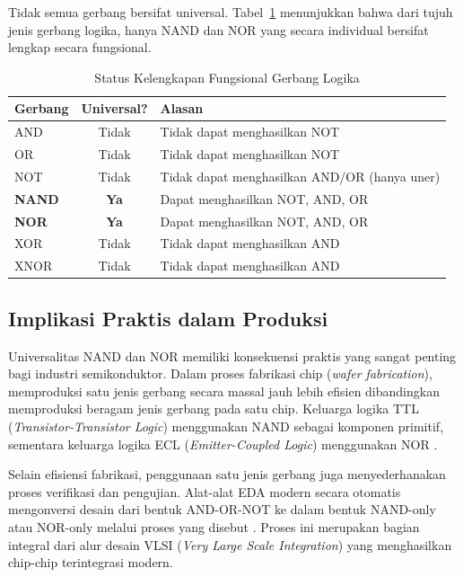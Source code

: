 Tidak semua gerbang bersifat universal. Tabel~\ref{tab:universalitas} menunjukkan bahwa dari tujuh jenis gerbang logika, hanya NAND dan NOR yang secara individual bersifat lengkap secara fungsional.

\begin{table}[htbp]
\centering
\renewcommand{\arraystretch}{1.3}
\begin{tabular}{|l|c|l|}
\hline
\textbf{Gerbang} & \textbf{Universal?} & \textbf{Alasan} \\ \hline
AND & Tidak & Tidak dapat menghasilkan NOT \\ \hline
OR & Tidak & Tidak dapat menghasilkan NOT \\ \hline
NOT & Tidak & Tidak dapat menghasilkan AND/OR (hanya uner) \\ \hline
\textbf{NAND} & \textbf{Ya} & Dapat menghasilkan NOT, AND, OR \\ \hline
\textbf{NOR} & \textbf{Ya} & Dapat menghasilkan NOT, AND, OR \\ \hline
XOR & Tidak & Tidak dapat menghasilkan AND \\ \hline
XNOR & Tidak & Tidak dapat menghasilkan AND \\ \hline
\end{tabular}
\caption{Status Kelengkapan Fungsional Gerbang Logika}
\label{tab:universalitas}
\end{table}

\subsection{Implikasi Praktis dalam Produksi}

Universalitas NAND dan NOR memiliki konsekuensi praktis yang sangat penting bagi industri semikonduktor. Dalam proses fabrikasi chip (\textit{wafer fabrication}), memproduksi satu jenis gerbang secara massal jauh lebih efisien dibandingkan memproduksi beragam jenis gerbang pada satu chip. Keluarga logika TTL (\textit{Transistor-Transistor Logic}) menggunakan NAND sebagai komponen primitif, sementara keluarga logika ECL (\textit{Emitter-Coupled Logic}) menggunakan NOR \cite{electronics_tutorials_gates}.

Selain efisiensi fabrikasi, penggunaan satu jenis gerbang juga menyederhanakan proses verifikasi dan pengujian. Alat-alat EDA modern secara otomatis mengonversi desain dari bentuk AND-OR-NOT ke dalam bentuk NAND-only atau NOR-only melalui proses yang disebut . Proses ini merupakan bagian integral dari alur desain VLSI (\textit{Very Large Scale Integration}) yang menghasilkan chip-chip terintegrasi modern.
